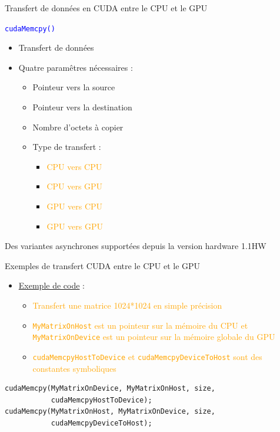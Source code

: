 \documentclass[handout,francais]{beamer}
\begin{document}
\begin{frame}{Transfert de données en CUDA entre le CPU et le GPU}

\textcolor{blue}{\Large\tt cudaMemcpy()}
\begin{itemize}
\item Transfert de données
\item Quatre paramêtres nécessaires :
  \begin{itemize}
  \item Pointeur vers la source
  \item Pointeur vers la destination
  \item Nombre d'octets à copier
  \item Type de transfert :
    \begin{itemize}
    \item \textcolor{orange}{CPU vers CPU}
    \item \textcolor{orange}{CPU vers GPU}
    \item \textcolor{orange}{GPU vers CPU}
    \item \textcolor{orange}{GPU vers GPU}
    \end{itemize}
  \end{itemize}
\end{itemize}
Des variantes asynchrones supportées depuis la version hardware 1.1HW
\end{frame}

\begin{frame}[containsverbatim]{Exemples de transfert CUDA entre le CPU et le GPU}
\begin{itemize}
\item \underline{Exemple de code} :
  \begin{itemize}
  \item \textcolor{orange}{Transfert une matrice 1024*1024 en simple précision}
  \item \textcolor{orange}{\texttt{MyMatrixOnHost} est un pointeur sur la mémoire du CPU
      et \texttt{MyMatrixOnDevice} est un pointeur sur la mémoire globale du GPU}
  \item \textcolor{orange}{\texttt{cudaMemcpyHostToDevice} et
      \texttt{cudaMemcpyDeviceToHost} sont des constantes symboliques}
  \end{itemize}
\end{itemize}
\begin{lstlisting}
cudaMemcpy(MyMatrixOnDevice, MyMatrixOnHost, size,
           cudaMemcpyHostToDevice);
cudaMemcpy(MyMatrixOnHost, MyMatrixOnDevice, size,
           cudaMemcpyDeviceToHost);
\end{lstlisting}
\end{frame}
\end{document}

